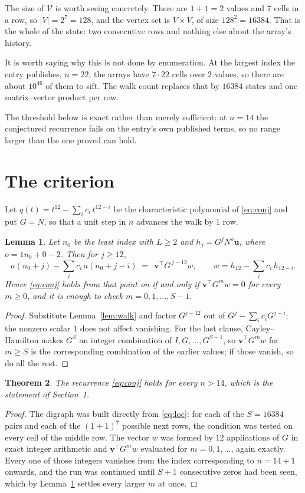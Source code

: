 \documentclass[11pt,a4paper]{article}
\theoremstyle{plain}
\newtheorem{theorem}{Theorem}
\newtheorem{lemma}[theorem]{Lemma}
\theoremstyle{definition}
\begin{document}
The size of $\mathcal V$ is worth seeing concretely. There are $1+1=2$ values
and $7$ cells in a row, so $|V|=2^{7}=128$, and the vertex set is
$V\times V$, of size $128^2=16384$. That is the whole of the state: two consecutive
rows and nothing else about the array's history.

It is worth saying why this is not done by enumeration. At the largest index the entry
publishes, $n=22$, the arrays have $7\cdot22$ cells over
$2$ values, so there are about $10^{46}$ of them to sift. The
walk count replaces that by $16384$ states and one matrix--vector product per row.

The threshold below is exact rather than merely sufficient: at $n=14$ the conjectured
recurrence fails on the entry's own published terms, so no range larger than the one proved
can hold.
\section{The criterion}

Let $q(t)=t^{12}-\sum_i c_i\,t^{12-i}$ be the characteristic polynomial of
\eqref{eq:conj} and put $G=N$, so that a unit step in $n$ advances the walk by
$1$ row.

\begin{lemma}\label{lem:crit}
Let $n_0$ be the least index with $L\ge2$ and $h_j=G^{j}N^{o}\mathbf{u}$, where
$o=1n_0+0-2$. Then for $j\ge12$,
\[
a(n_0+j)-\sum_i c_i\,a(n_0+j-i)\;=\;\,\mathbf{v}^{\!\top}G^{\,j-12}w,
\qquad w=h_{12}-\sum_i c_i\,h_{12-i} .
\]
Hence \eqref{eq:conj} holds from that point on if and only if
$\mathbf{v}^{\!\top}G^{m}w=0$ for every $m\ge0$, and it is enough to check
$m=0,1,\dots,S-1$.
\end{lemma}

\begin{proof}
Substitute Lemma~\ref{lem:walk} and factor $G^{j-12}$ out of
$G^{j}-\sum_ic_iG^{j-i}$; the nonzero scalar $1$ does not affect
vanishing. For the last clause, Cayley--Hamilton makes $G^{S}$ an integer combination of
$I,G,\dots,G^{S-1}$, so $\mathbf{v}^{\!\top}G^{m}w$ for $m\ge S$ is the corresponding
combination of the earlier values; if those vanish, so do all the rest.
\end{proof}

\begin{theorem}
The recurrence \eqref{eq:conj} holds for every $n>14$, which is the statement of
Section~1.
\end{theorem}

\begin{proof}
The digraph was built directly from \eqref{eq:loc}: for each of the $S=16384$ pairs and each
of the $(1+1)^{7}$ possible next rows, the condition was tested on every cell of
the middle row. The vector $w$ was formed by $12$ applications of $G$ in exact integer
arithmetic and $\mathbf{v}^{\!\top}G^{m}w$ evaluated for $m=0,1,\dots$, again exactly.
Every one of those integers vanishes from the index corresponding to $n=14+1$ onwards,
and the run was continued until $S+1$ consecutive zeros had been seen, which by
Lemma~\ref{lem:crit} settles every larger $m$ at once.
\end{proof}
\end{document}

